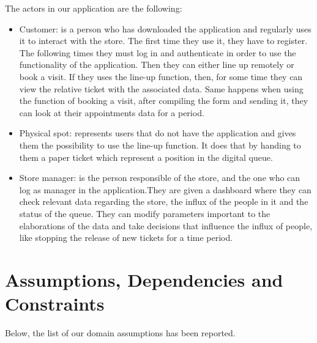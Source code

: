The actors in our application are the following:

\begin{itemize}

    \item Customer: is a person who has downloaded the application and regularly uses it to interact with the store. The first time they use it, they have to register. The following times they must log in and authenticate in order to use the functionality of the application. Then they can either line up remotely or book a visit. If they uses the line-up function, then, for some time they can view the relative ticket with the associated data. Same happens
    when using the function of booking a visit, after compiling the form and sending it, they can look at their appointments data for a period.
    \item Physical spot: represents users that do not have the application and gives them the possibility to use the line-up function. It does that by handing to them a paper ticket which represent a position in the digital queue.
    \item Store manager: is the person responsible of the store, and the one who can log as manager in the application.They are given a dashboard where they can check relevant data regarding the store, the influx of the people in it and the status of the queue. They can modify parameters important to the elaborations of the data and take decisions that influence the influx of people, like stopping the release of new tickets for a time period.

\end{itemize}


\section{Assumptions, Dependencies and Constraints}

Below, the list of our domain assumptions has been reported.

